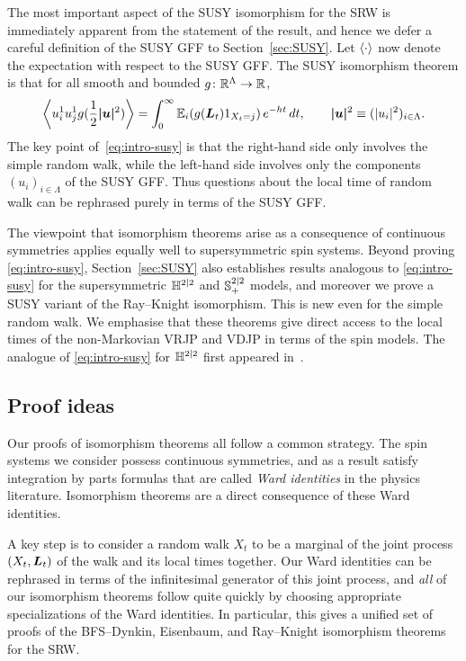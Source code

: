 \documentclass[11pt,a4paper]{article}
\begin{document}
The most important aspect of the SUSY isomorphism for the SRW is
immediately apparent from the statement of the result, and hence we
defer a careful definition of the SUSY GFF to Section~\ref{sec:SUSY}.
Let $\langle \cdot \rangle$ now denote the expectation with respect to
the SUSY GFF. The SUSY isomorphism theorem is that for all smooth and
bounded $g\colon \mathbb{R}^{\Lambda}\to \mathbb{R}$,
\begin{equation}
  \label{eq:intro-susy}
  \avga{u_{i}^{1}u_{j}^{1} g(\frac{1}{2} \V{|u|}^{2})} = 
  \int_{0}^{\infty} \E_{i} (g(\V{L}_{t}) 1_{X_{t}=j}) \, e^{-ht}\, dt,
  \qquad \V{|u|}^2 \bydef (|u_i|^2)_{i\in\Lambda}.
\end{equation}
The key point of~\eqref{eq:intro-susy} is that the right-hand side
only involves the simple random walk, while the left-hand side involves
only the components $(u_{i})_{i\in\Lambda}$ of the SUSY GFF. Thus
questions about the local time of random walk can be rephrased purely
in terms of the SUSY GFF.

The viewpoint that isomorphism theorems arise as a consequence of
continuous symmetries applies equally well to supersymmetric spin
systems. Beyond proving \eqref{eq:intro-susy}, Section~\ref{sec:SUSY}
also establishes results analogous to \eqref{eq:intro-susy} for the
supersymmetric $\mathbb{H}^{2|2}$ and ${\mathbb S}^{2|2}_{+}$ models, and
moreover we prove a SUSY variant of the
Ray--Knight isomorphism. This is new even for the simple random walk. We
emphasise that these theorems give direct access to the local times
of the non-Markovian VRJP and VDJP in terms of the spin models. The
analogue of \eqref{eq:intro-susy} for $\mathbb{H}^{2|2}$ first appeared
in~\cite{1802.02077}.

\subsection{Proof ideas}
\label{sec:proof-ideas}

Our proofs of isomorphism theorems all follow a common strategy. The
spin systems we consider possess continuous symmetries, and as a
result satisfy integration by parts formulas that are called
\emph{Ward identities} in the physics literature. Isomorphism theorems
are a direct  consequence of these Ward identities. 

A key step is to consider a random walk $X_{t}$ to be a marginal of
the joint process $(X_{t},\boldsymbol{L}_{t})$ of the walk and its local times
together. Our Ward identities can be rephrased in terms of the
infinitesimal generator of this joint process, and \emph{all} of our
isomorphism theorems follow quite quickly by choosing appropriate
specializations of the Ward identities. In particular, this gives a
unified set of proofs of the BFS--Dynkin, Eisenbaum,
and Ray--Knight isomorphism theorems for the SRW.
\end{document}
